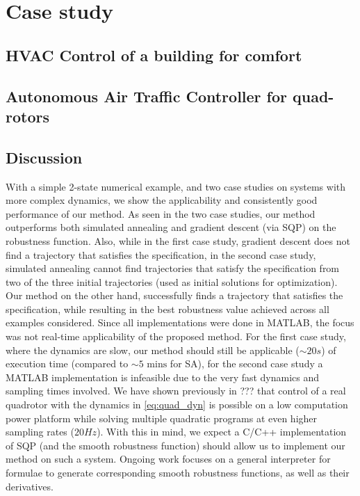 \section{Case study}
\label{sec:case study}


\subsection{HVAC Control of a building for comfort}



\subsection{Autonomous Air Traffic Controller for quad-rotors}


\subsection{Discussion}
With a simple 2-state numerical example, and two case studies on systems with more complex dynamics, we show the applicability and consistently good performance of our method. As seen in the two case studies, our method outperforms both simulated annealing and gradient descent (via SQP) on the robustness function. Also, while in the first case study, gradient descent does not find a trajectory that satisfies the specification, in the second case study, simulated annealing cannot find trajectories that satisfy the specification from two of the three initial trajectories (used as initial solutions for optimization). Our method on the other hand, successfully finds a trajectory that satisfies the specification, while resulting in the best robustness value achieved across all examples considered. 
Since all implementations were done in MATLAB, the focus was not real-time applicability of the proposed method. For the first case study, where the dynamics are slow, our method should still be applicable ($\sim 20s$) of execution time (compared to $\sim 5 \text{ mins}$ for SA), for the second case study a MATLAB implementation is infeasible due to the very fast dynamics and sampling times involved. We have shown previously in ??? that control of a real quadrotor with the dynamics in \eqref{eq:quad_dyn} is possible on a low computation power platform while solving multiple quadratic programs at even higher sampling rates ($20Hz$). With this in mind, we expect a C/C++ implementation of SQP (and the smooth robustness function) should allow us to implement our method on such a system. Ongoing work focuses on a general interpreter for formulae to generate corresponding smooth robustness functions, as well as their derivatives.